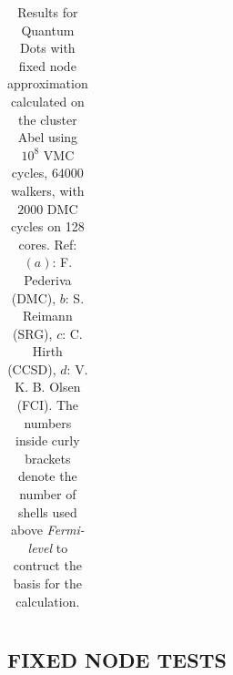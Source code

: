\begin{table}
\begin{center}
\begin{tabular}{rl|rrrrrr}
\end{tabular}
\caption{Results for Quantum Dots with fixed node approximation calculated on the cluster Abel using $10^8$ VMC cycles, $64000$ walkers, with $2000$ DMC cycles on 128 cores. Ref: $(a)$: F. Pederiva \cite{MagnusArticle} (DMC), $b$: S. Reimann \cite{Sarah} (SRG), $c$: C. Hirth \cite{Hirth} (CCSD), $d$: V. K. B. Olsen \cite{Olsen} (FCI). The numbers inside curly brackets denote the number of shells used above \textit{Fermi-level} to contruct the basis for the calculation.}
\label{tab:QDotsResultsAll}
\end{center}
\end{table}
\setlength{\tabcolsep}{6pt}

\subsection{FIXED NODE TESTS}

